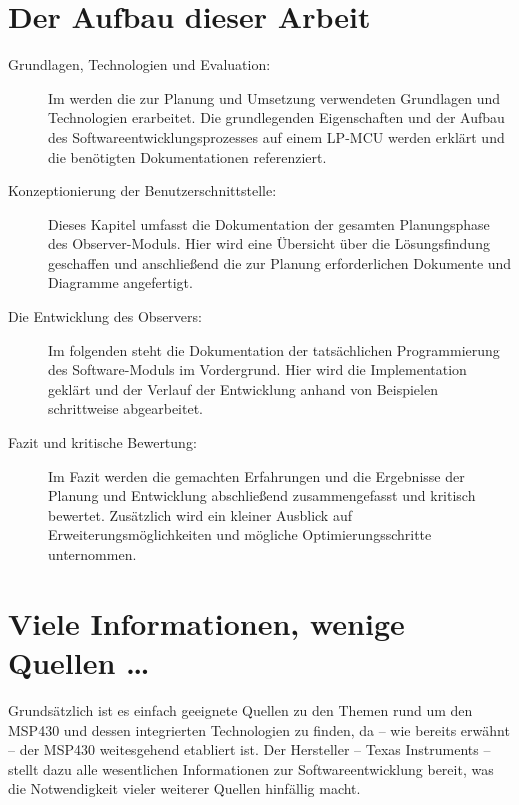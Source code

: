 \section{Der Aufbau dieser Arbeit}
\label{sec:AufbauDieserArbeit}

\begin{description}

	\item[Grundlagen, Technologien und Evaluation:] Im  werden die zur Planung und Umsetzung verwendeten Grundlagen und Technologien erarbeitet. Die grundlegenden Eigenschaften und der Aufbau des Softwareentwicklungsprozesses auf einem LP-MCU werden erkl\"art und die ben\"otigten Dokumentationen referenziert.
	
	\item[Konzeptionierung der Benutzerschnittstelle:] Dieses Kapitel umfasst die Dokumentation der gesamten Planungsphase des Observer-Moduls. Hier wird eine \"Ubersicht \"uber die L\"osungsfindung geschaffen und anschlie{\ss}end die zur Planung erforderlichen Dokumente und Diagramme angefertigt.
	
	\item[Die Entwicklung des Observers:] Im folgenden steht die Dokumentation der tats\"achlichen Programmierung des Software-Moduls im Vordergrund. Hier wird die Implementation gekl\"art und der Verlauf der Entwicklung anhand von Beispielen schrittweise abgearbeitet.
	
	\item[Fazit und kritische Bewertung:] Im Fazit werden die gemachten Erfahrungen und die Ergebnisse der Planung und Entwicklung abschlie{\ss}end zusammengefasst und kritisch bewertet. Zus\"atzlich wird ein kleiner Ausblick auf Erweiterungsm\"oglichkeiten und m\"ogliche Optimierungsschritte unternommen.

\end{description}


\section{Viele Informationen, wenige Quellen \dots}
\label{sec:Quellenlage}

Grunds\"atzlich ist es einfach geeignete Quellen zu den Themen rund um den MSP430 und dessen integrierten Technologien zu finden, da -- wie bereits erw\"ahnt -- der MSP430 weitesgehend etabliert ist. Der Hersteller -- Texas Instruments -- stellt dazu alle wesentlichen Informationen zur Softwareentwicklung bereit, was die Notwendigkeit vieler weiterer Quellen hinf\"allig macht.